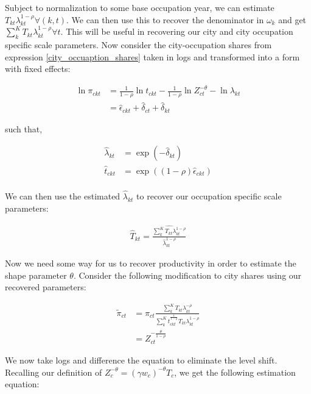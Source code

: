 \documentclass[10pt]{article}
\begin{document}
Subject to normalization to some base occupation year, we can estimate $T_{kt} \lambda_{kt}^{1 - \rho} \forall (k, t)$. We can then use this to recover the denominator in $\omega_k$ and get $\sum_{k}^{K} T_{kt} \lambda_{kt}^{1 - \rho} \forall t$. This will be useful in recovering our city and city occupation specific scale parameters. Now consider the city-occupation shares from expression \ref{city_occuaption_shares} taken in logs and transformed into a form with fixed effects:

\begin{align*}
    \ln \pi_{ckt} & = \frac{1}{1 - \rho} \ln t_{ckt} - \frac{1}{1 - \rho} \ln Z_{ct}^{- \theta} - \ln \lambda_{kt} \\
                  & = \hat{\epsilon}_{ckt} + \hat{\delta}_{ct} + \hat{\delta}_{kt}
\end{align*}

such that,

\begin{align*}
    \hat{\lambda}_{kt} & = \exp \left( - \hat{\delta}_{kt} \right)             \\
    \hat{t}_{ckt}      & = \exp \left( (1 - \rho) \hat{\epsilon}_{ckt} \right) \\
\end{align*}

We can then use the estimated $\hat{\lambda}_{kt}$ to recover our occupation specific scale parameters:

\begin{align*}
    \hat{T}_{kt} = \frac{\widehat{\sum_{k}^{K} T_{kt} \lambda_{kt}^{1 - \rho}}}{\hat{\lambda}_{kt}^{1 - \rho}}
\end{align*}

Now we need some way for us to recover productivity in order to estimate the shape parameter $\theta$. Consider the following modification to city shares using our recovered parameters:

\begin{align*}
    \tilde{\pi}_{ct} & = \pi_{ct} \frac{\sum_{k}^{K} T_{kt} \lambda_{kt}^{- \rho}}{\sum_{k}^{K} t_{ckt}^{\frac{1}{1 - \rho}} T_{kt} \lambda_{kt}^{1 - \rho}} \\
                     & = Z_{ct}^{- \frac{\theta}{1 - \rho}}
\end{align*}

We now take logs and difference the equation to eliminate the level shift. Recalling our definition of $Z_c^{- \theta} = (\gamma w_c)^{- \theta} T_c$, we get the following estimation equation:
\end{document}
